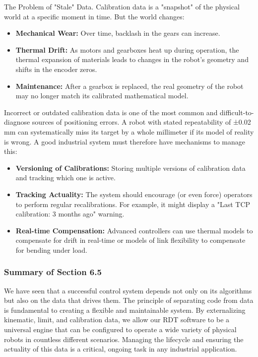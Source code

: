 \begin{dangerbox}{The Problem of "Stale" Data.}
    Calibration data is a "snapshot" of the physical world at a specific moment in time. But the world changes:
    \begin{itemize}
        \item \textbf{Mechanical Wear:} Over time, backlash in the gears can increase.
        \item \textbf{Thermal Drift:} As motors and gearboxes heat up during operation, the thermal expansion of materials leads to changes in the robot's geometry and shifts in the encoder zeros.
        \item \textbf{Maintenance:} After a gearbox is replaced, the real geometry of the robot may no longer match its calibrated mathematical model.
    \end{itemize}
    
    Incorrect or outdated calibration data is one of the most common and difficult-to-diagnose sources of positioning errors. A robot with stated repeatability of ±0.02 mm can systematically miss its target by a whole millimeter if its model of reality is wrong. A good industrial system must therefore have mechanisms to manage this:
    \begin{itemize}
        \item \textbf{Versioning of Calibrations:} Storing multiple versions of calibration data and tracking which one is active.
        \item \textbf{Tracking Actuality:} The system should encourage (or even force) operators to perform regular recalibrations. For example, it might display a "Last TCP calibration: 3 months ago" warning.
        \item \textbf{Real-time Compensation:} Advanced controllers can use thermal models to compensate for drift in real-time or models of link flexibility to compensate for bending under load.
    \end{itemize}
\end{dangerbox}

\subsubsection{Summary of Section 6.5}
\label{subsubsec:stage6_5_summary}

We have seen that a successful control system depends not only on its algorithms but also on the data that drives them. The principle of separating code from data is fundamental to creating a flexible and maintainable system. By externalizing kinematic, limit, and calibration data, we allow our RDT software to be a universal engine that can be configured to operate a wide variety of physical robots in countless different scenarios. Managing the lifecycle and ensuring the actuality of this data is a critical, ongoing task in any industrial application.



